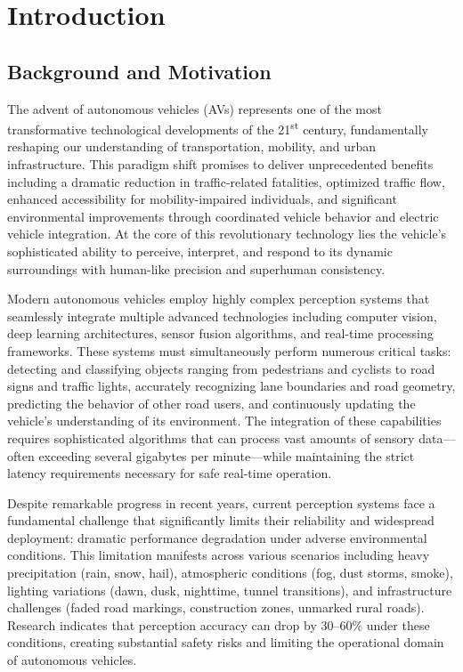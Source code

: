 \chapter{Introduction}
\section{Background and Motivation}

The advent of autonomous vehicles (AVs) represents one of the most transformative technological developments of the 21\textsuperscript{st} century, fundamentally reshaping our understanding of transportation, mobility, and urban infrastructure. This paradigm shift promises to deliver unprecedented benefits including a dramatic reduction in traffic-related fatalities, optimized traffic flow, enhanced accessibility for mobility-impaired individuals, and significant environmental improvements through coordinated vehicle behavior and electric vehicle integration. At the core of this revolutionary technology lies the vehicle's sophisticated ability to perceive, interpret, and respond to its dynamic surroundings with human-like precision and superhuman consistency.

Modern autonomous vehicles employ highly complex perception systems that seamlessly integrate multiple advanced technologies including computer vision, deep learning architectures, sensor fusion algorithms, and real-time processing frameworks. These systems must simultaneously perform numerous critical tasks: detecting and classifying objects ranging from pedestrians and cyclists to road signs and traffic lights, accurately recognizing lane boundaries and road geometry, predicting the behavior of other road users, and continuously updating the vehicle's understanding of its environment. The integration of these capabilities requires sophisticated algorithms that can process vast amounts of sensory data—often exceeding several gigabytes per minute—while maintaining the strict latency requirements necessary for safe real-time operation.

Despite remarkable progress in recent years, current perception systems face a fundamental challenge that significantly limits their reliability and widespread deployment: dramatic performance degradation under adverse environmental conditions. This limitation manifests across various scenarios including heavy precipitation (rain, snow, hail), atmospheric conditions (fog, dust storms, smoke), lighting variations (dawn, dusk, nighttime, tunnel transitions), and infrastructure challenges (faded road markings, construction zones, unmarked rural roads). Research indicates that perception accuracy can drop by 30--60\% under these conditions, creating substantial safety risks and limiting the operational domain of autonomous vehicles.

